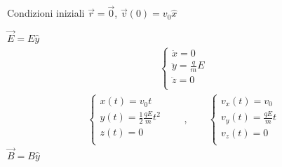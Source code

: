\documentclass[letterpaper,10pt,italian]{jupyterBook}
\begin{document}
\sphinxAtStartPar
{}
Condizioni iniziali \(\vec{r} = \vec{0}\), \(\vec{v}(0) = v_0 \hat{x}\)

\sphinxAtStartPar
{} \(\vec{E} = E \hat{y}\)
\begin{equation*}
\begin{split}\begin{cases}
  \ddot{x} = 0                \\
  \ddot{y} = \frac{q}{m} E    \\
  \ddot{z} = 0                \\
\end{cases}\end{split}
\end{equation*}\begin{equation*}
\begin{split}
\begin{cases}
  x(t) = v_0 t \\
  y(t) = \frac{1}{2} \frac{q E}{m} t^2 \\
  z(t) =   0   \\
\end{cases}
\qquad , \qquad
\begin{cases}
  v_x(t) = v_0 \\
  v_y(t) = \frac{q E}{m} t \\
  v_z(t) =   0 \\
\end{cases}
\end{split}
\end{equation*}
\sphinxAtStartPar
{} \(\vec{B} = B \hat{y}\)
\end{document}
